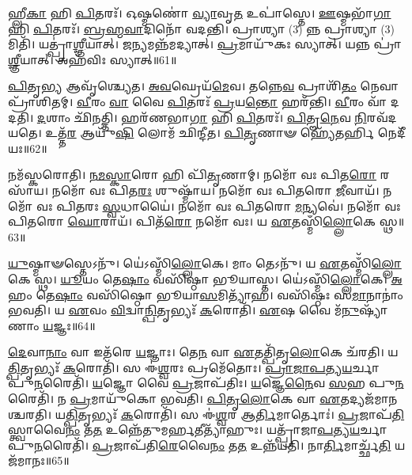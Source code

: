 𑌹𑍍𑌲𑍀\-\ul{𑌕𑌾} 𑌹𑌿 \ul{𑌪𑌿}\-𑌤𑌰𑌃᳴।
𑌓𑌷𑍍𑌮𑌣𑍋॑ \ul{𑌵𑍍𑌯𑌾}\-𑌵𑍃\-\ul{𑌤} 𑌉𑌪𑌾॑𑌸𑍍𑌤𑍇।
\-\ul{𑌊}\-𑌷𑍍𑌮𑌭𑌾᳴\-\ul{𑌗𑌾} 𑌹𑌿 \ul{𑌪𑌿}\-𑌤𑌰𑌃᳴।
\-\ul{𑌬𑍍𑌰}\-\-\ul{𑌹𑍍𑌮}\-\-\ul{𑌵𑌾}\-𑌦𑌿𑌨𑍋᳴ 𑌵𑌦𑌨𑍍𑌤𑌿।
𑌪𑍍𑌰𑌾𑌶𑍍𑌯𑌾 (3) 𑌨𑍍𑌨 𑌪𑍍𑌰𑌾𑌶𑍍𑌯𑌾 (3) 𑌮𑌿𑌤𑌿᳴।
𑌯𑌤𑍍𑌪𑍍𑌰𑌾॑\-\ul{𑌶𑍍𑌞𑍀}\-𑌯𑌾𑌤𑍍।
𑌜\-\ul{𑌨𑍍𑌯}\-𑌮𑌨𑍍𑌨᳴𑌮𑌦𑍍𑌯𑌾𑌤𑍍।
\-\ul{𑌪𑍍𑌰}\-𑌮𑌾𑌯𑍁᳴𑌕𑌃 𑌸𑍍𑌯𑌾𑌤𑍍।
𑌯𑌨𑍍𑌨 𑌪𑍍𑌰𑌾॑\-\ul{𑌶𑍍𑌞𑍀}\-𑌯𑌾𑌤𑍍।
𑌅𑌹᳴𑌵𑌿𑌃 𑌸𑍍𑌯𑌾𑌤𑍍॥61॥

\-\ul{𑌪𑌿}\-𑌤𑍃\-\ul{𑌭𑍍𑌯} 𑌆𑌵𑍃᳴𑌶𑍍𑌚𑍍𑌯𑍇𑌤।
\-\ul{𑌅}\-\-\ul{𑌵}\-𑌘𑍍𑌰𑍇𑌯᳴\-\ul{𑌮𑍇}\-𑌵।
𑌤𑌨𑍍𑌨𑍇\-\ul{𑌵} 𑌪𑍍𑌰𑌾𑌶𑌿᳴\-\ul{𑌤𑌂} 𑌨𑍇𑌵𑌾𑌪𑍍𑌰𑌾᳴𑌶𑌿𑌤𑌮𑍍।
\-\ul{𑌵𑍀}\-𑌰𑌂 \ul{𑌵𑌾} 𑌵𑍈 \ul{𑌪𑌿}\-𑌤𑌰𑌃᳴ \ul{𑌪𑍍𑌰}\-𑌯\-\ul{𑌨𑍍𑌤𑍋} 𑌹𑌰᳴𑌨𑍍𑌤𑌿।
\-\ul{𑌵𑍀}\-𑌰𑌂 𑌵𑌾᳴ 𑌦𑌦𑌤𑌿।
\-\ul{𑌦}\-𑌶𑌾𑌂 𑌛𑌿᳴𑌨𑌤𑍍𑌤𑌿।
𑌹𑌰᳴𑌣𑌭𑌾\-\ul{𑌗𑌾} 𑌹𑌿 \ul{𑌪𑌿}\-𑌤𑌰𑌃᳴।
\-\ul{𑌪𑌿}\-𑌤𑍄\-\ul{𑌨𑍇}\-𑌵 \ul{𑌨𑌿}\-𑌰𑌵᳴𑌦𑌯𑌤𑍇।
𑌉𑌤𑍍𑌤᳴\-\ul{𑌰} 𑌆𑌯𑍁᳴\-\ul{𑌷𑌿} 𑌲𑍋𑌮᳴ 𑌛𑌿𑌨𑍍𑌦𑍀𑌤।
\-\ul{𑌪𑌿}\-\-\ul{𑌤𑍃}\-𑌣𑌾𑍟 𑌹𑍍𑌯𑍇᳴𑌤𑌰𑍍\mbox{}\-\ul{𑌹𑌿} 𑌨𑍇𑌦𑍀᳴𑌯𑌃॥62॥

𑌨𑌮᳴𑌸𑍍𑌕𑌰𑍋𑌤𑌿।
\-\ul{𑌨}\-\-\ul{𑌮}\-\-\ul{𑌸𑍍𑌕𑌾}\-𑌰𑍋 𑌹𑌿 𑌪𑌿᳴\-\ul{𑌤𑍃}\-𑌣𑌾𑌮𑍍।
𑌨𑌮𑍋᳴ 𑌵𑌃 𑌪𑌿𑌤\-\ul{𑌰𑍋} 𑌰𑌸𑌾᳴𑌯।
𑌨𑌮𑍋᳴ 𑌵𑌃 𑌪𑌿𑌤\-\ul{𑌰𑌃} 𑌶𑍁𑌷𑍍𑌮𑌾᳴𑌯।
𑌨𑌮𑍋᳴ 𑌵𑌃 𑌪𑌿𑌤𑌰𑍋 \ul{𑌜𑍀}\-𑌵𑌾𑌯᳴।
𑌨𑌮𑍋᳴ 𑌵𑌃 𑌪𑌿𑌤𑌰𑌃 \ul{𑌸𑍍𑌵}\-𑌧𑌾𑌯𑍈॑।
𑌨𑌮𑍋᳴ 𑌵𑌃 𑌪𑌿𑌤𑌰𑍋 \ul{𑌮}\-𑌨𑍍𑌯𑌵𑍇॑।
𑌨𑌮𑍋᳴ 𑌵𑌃 𑌪𑌿𑌤𑌰𑍋 \ul{𑌘𑍋}\-𑌰𑌾𑌯᳴।
𑌪𑌿𑌤᳴\-\ul{𑌰𑍋} 𑌨𑌮𑍋᳴ 𑌵𑌃।
𑌯 \ul{𑌏}\-𑌤𑌸𑍍𑌮𑌿𑌁᳴\-\ul{𑌲𑍍𑌲𑍋}\-𑌕𑍇 𑌸𑍍𑌥॥63॥

\-\ul{𑌯𑍁}\-𑌷𑍍𑌮𑌾𑍟𑌸𑍍𑌤𑍇𑌽𑌨𑍁᳴।
𑌯𑍇॑𑌽𑌸𑍍𑌮𑌿𑌁\-\ul{𑌲𑍍𑌲𑍋}\-𑌕𑍇।
𑌮𑌾𑌂 𑌤𑍇𑌽𑌨𑍁᳴।
𑌯 \ul{𑌏}\-𑌤𑌸𑍍𑌮𑌿𑌁᳴\-\ul{𑌲𑍍𑌲𑍋}\-𑌕𑍇 𑌸𑍍𑌥।
\-\ul{𑌯𑍂}\-𑌯𑌂 𑌤𑍇\-\ul{𑌷𑌾𑌂} 𑌵𑌸𑌿᳴𑌷𑍍𑌠𑌾 𑌭𑍂𑌯𑌾𑌸𑍍𑌤।
𑌯𑍇॑𑌽𑌸𑍍𑌮𑌿𑌁\-\ul{𑌲𑍍𑌲𑍋}\-𑌕𑍇।
\-\ul{𑌅}\-𑌹𑌂 𑌤𑍇\-\ul{𑌷𑌾𑌂} 𑌵𑌸𑌿᳴𑌷𑍍𑌠𑍋 𑌭𑍂𑌯𑌾\-\ul{𑌸}\-𑌮𑌿𑌤𑍍𑌯𑌾᳴𑌹।
𑌵𑌸𑌿᳴𑌷𑍍𑌠𑌃 𑌸\-\ul{𑌮𑌾}\-𑌨𑌾𑌨𑌾𑌂॑ 𑌭𑌵𑌤𑌿।
𑌯 \ul{𑌏}\-𑌵𑌂 \ul{𑌵𑌿}\-𑌦𑍍𑌵𑌾\-\ul{𑌨𑍍𑌪𑌿}\-𑌤𑍃𑌭𑍍𑌯𑌃᳴ \ul{𑌕}\-𑌰𑍋𑌤𑌿᳴।
\-\ul{𑌏}\-𑌷 𑌵𑍈 𑌮᳴\-\ul{𑌨𑍁}\-𑌷𑍍𑌯𑌾᳴𑌣𑌾𑌂 \ul{𑌯}\-𑌜𑍍𑌞𑌃॥64॥

\-\ul{𑌦𑍇}\-𑌵𑌾\-\ul{𑌨𑌾𑌂} 𑌵𑌾 𑌇𑌤᳴𑌰𑍇 \ul{𑌯}\-𑌜𑍍𑌞𑌾𑌃।
𑌤𑍇\-\ul{𑌨} 𑌵𑌾 \ul{𑌏}\-𑌤𑌤𑍍𑌪𑌿᳴𑌤𑍃\-\ul{𑌲𑍋}\-𑌕𑍇 𑌚᳴𑌰𑌤𑌿।
𑌯\-\ul{𑌤𑍍𑌪𑌿}\-𑌤𑍃𑌭𑍍𑌯𑌃᳴ \ul{𑌕}\-𑌰𑍋𑌤𑌿᳴।
𑌸 𑌈॑\-\ul{𑌶𑍍𑌵}\-𑌰𑌃 𑌪𑍍𑌰𑌮𑍇᳴𑌤𑍋𑌃।
\-\ul{𑌪𑍍𑌰𑌾}\-\-\ul{𑌜𑌾}\-\-\ul{𑌪}\-𑌤𑍍𑌯\-\ul{𑌯}\-𑌰𑍍𑌚𑌾 𑌪𑍁\-\ul{𑌨}\-𑌰𑍈𑌤𑌿᳴।
\-\ul{𑌯}\-𑌜𑍍𑌞𑍋 𑌵𑍈 \ul{𑌪𑍍𑌰}\-𑌜𑌾\-𑌪᳴𑌤𑌿𑌃।
\-\ul{𑌯}\-𑌜𑍍𑌞𑍇\-\ul{𑌨𑍈}\-𑌵 \ul{𑌸}\-𑌹 𑌪𑍁\-\ul{𑌨}\-𑌰𑍈𑌤𑌿᳴।
𑌨 \ul{𑌪𑍍𑌰}\-𑌮𑌾𑌯𑍁᳴𑌕𑍋 𑌭𑌵𑌤𑌿।
\-\ul{𑌪𑌿}\-\-\ul{𑌤𑍃}\-\-\ul{𑌲𑍋}\-𑌕𑍇 𑌵𑌾 \ul{𑌏}\-𑌤𑌦𑍍𑌯𑌜᳴𑌮𑌾𑌨𑌶𑍍𑌚𑌰𑌤𑌿।
𑌯\-\ul{𑌤𑍍𑌪𑌿}\-𑌤𑍃𑌭𑍍𑌯𑌃᳴ \ul{𑌕}\-𑌰𑍋𑌤𑌿᳴।
𑌸 𑌈॑\-\ul{𑌶𑍍𑌵}\-𑌰 𑌆\-\ul{𑌰𑍍𑌤𑌿}\-𑌮𑌾𑌰𑍍𑌤𑍋𑌃॑।
\-\ul{𑌪𑍍𑌰}\-𑌜𑌾𑌪᳴\-\ul{𑌤𑌿}\-𑌸𑍍𑌤𑍍𑌵𑌾𑌵𑍈\-\ul{𑌨𑌂} 𑌤\-\ul{𑌤} 𑌉𑌨𑍍𑌨𑍇᳴𑌤𑍁𑌮𑌰𑍍\mbox{}\-\ul{𑌹}\-𑌤𑍀𑌤𑍍𑌯𑌾᳴𑌹𑍁𑌃।
𑌯𑌤𑍍𑌪𑍍𑌰𑌾᳴𑌜𑌾\-\ul{𑌪}\-𑌤𑍍𑌯\-\ul{𑌯}\-𑌰𑍍𑌚𑌾 𑌪𑍁\-\ul{𑌨}\-𑌰𑍈𑌤𑌿᳴।
\-\ul{𑌪𑍍𑌰}\-𑌜𑌾𑌪᳴𑌤𑌿\-\ul{𑌰𑍇}\-𑌵𑍈\-\ul{𑌨𑌂} 𑌤\-\ul{𑌤} 𑌉𑌨𑍍𑌨᳴𑌯𑌤𑌿।
𑌨𑌾\-\ul{𑌰𑍍𑌤𑌿}\-𑌮𑌾𑌰𑍍𑌚𑍍𑌛᳴\-\ul{𑌤𑌿} 𑌯𑌜᳴𑌮𑌾𑌨𑌃॥65॥\anuvakamend[𑌇𑌤𑍍𑌯᳴𑌶𑍍𑌞𑍁𑌤𑍇 𑌪𑌦𑍍𑌯𑌨𑍍𑌤𑍇 𑌪𑌦𑍍𑌯\-\ul{𑌨𑍍𑌤𑍇} 𑌷𑌡𑍍𑌵𑌾 \ul{𑌋}\-𑌤𑌵𑍋᳴ 𑌵\-\ul{𑌰𑍍𑌤}\-𑌤𑍇\-𑌽𑌹᳴𑌵𑌿𑌃 \ul{𑌸𑍍𑌯𑌾}\-𑌨𑍍𑌨𑍇𑌦𑍀᳴\-\ul{𑌯𑌃} 𑌸𑍍𑌥 \ul{𑌯}\-𑌜𑍍𑌞𑍋 𑌯𑌜᳴𑌮𑌾𑌨𑌶𑍍𑌚𑌰\-\ul{𑌤𑌿} 𑌯\-\ul{𑌤𑍍𑌪𑌿}\-𑌤𑍃𑌭𑍍𑌯𑌃᳴ \ul{𑌕}\-𑌰𑍋\-\ul{𑌤𑌿} 𑌪𑌞𑍍𑌚᳴ 𑌚]




